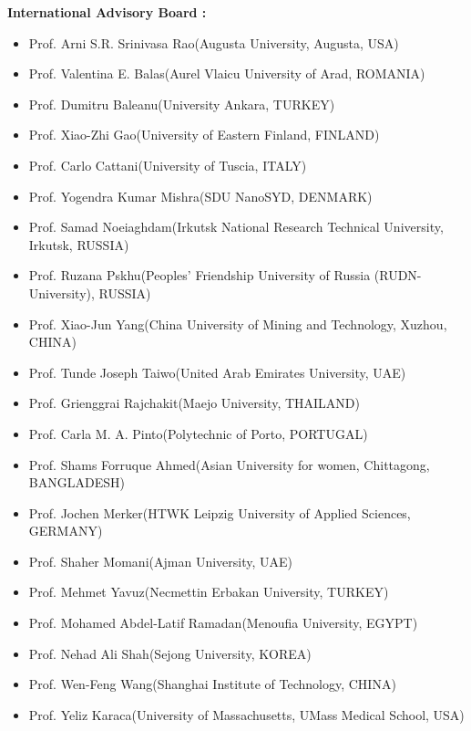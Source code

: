 \documentclass[twoside,11pt]{amsart}
\begin{document}
\noindent
{\Large \bf International Advisory Board : }
\\
\begin{itemize}
\item Prof. Arni S.R. Srinivasa Rao(Augusta University, Augusta, USA)
\item Prof. Valentina E. Balas(Aurel Vlaicu University of Arad, ROMANIA)
\item Prof. Dumitru Baleanu(University Ankara, TURKEY)
\item Prof. Xiao-Zhi Gao(University of Eastern Finland, FINLAND)
\item Prof. Carlo Cattani(University of Tuscia, ITALY)
\item Prof. Yogendra Kumar Mishra(SDU NanoSYD, DENMARK)
\item Prof. Samad Noeiaghdam(Irkutsk National Research Technical University, Irkutsk, RUSSIA)
\item Prof. Ruzana Pskhu(Peoples’ Friendship University of Russia (RUDN-University), RUSSIA)
\item Prof. Xiao-Jun Yang(China University of Mining and Technology, Xuzhou, CHINA)
\item Prof. Tunde Joseph Taiwo(United Arab Emirates University, UAE)
\item Prof. Grienggrai Rajchakit(Maejo University, THAILAND)
\item Prof. Carla M. A. Pinto(Polytechnic of Porto, PORTUGAL)
\item Prof. Shams Forruque Ahmed(Asian University for women, Chittagong, BANGLADESH)
\item Prof. Jochen Merker(HTWK Leipzig University of Applied Sciences, GERMANY)
\item Prof. Shaher Momani(Ajman University, UAE)
\item Prof. Mehmet Yavuz(Necmettin Erbakan University, TURKEY)
\item Prof. Mohamed Abdel-Latif Ramadan(Menoufia University, EGYPT)
\item Prof. Nehad Ali Shah(Sejong University, KOREA)
\item Prof. Wen-Feng Wang(Shanghai Institute of Technology, CHINA)
\item Prof. Yeliz Karaca(University of Massachusetts, UMass Medical School, USA)


\end{itemize}
\end{document}
